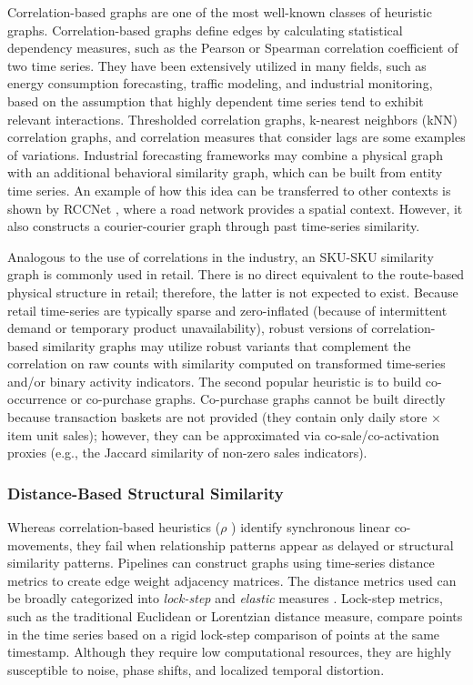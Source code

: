 Correlation-based graphs are one of the most well-known classes of heuristic graphs. Correlation-based graphs define edges by calculating statistical dependency measures, such as the Pearson or Spearman correlation coefficient of two time series. They have been extensively utilized in many fields, such as energy consumption forecasting, traffic modeling, and industrial monitoring, based on the assumption that highly dependent time series tend to exhibit relevant interactions. Thresholded correlation graphs, k-nearest neighbors (kNN) correlation graphs, and correlation measures that consider lags are some examples of variations. Industrial forecasting frameworks may combine a physical graph with an additional behavioral similarity graph, which can be built from entity time series. An example of how this idea can be transferred to other contexts is shown by RCCNet \cite{10.1145/3690649}, where a road network provides a spatial context. However, it also constructs a courier-courier graph through past time-series similarity.

Analogous to the use of correlations in the industry, an SKU-SKU similarity graph is commonly used in retail. There is no direct equivalent to the route-based physical structure in retail; therefore, the latter is not expected to exist. Because retail time-series are typically sparse and zero-inflated (because of intermittent demand or temporary product unavailability), robust versions of correlation-based similarity graphs may utilize robust variants that complement the correlation on raw counts with similarity computed on transformed time-series and/or binary activity indicators.  The second popular heuristic is to build co-occurrence or co-purchase graphs. Co-purchase graphs cannot be built directly because transaction baskets are not provided (they contain only daily store × item unit sales); however, they can be approximated via co-sale/co-activation proxies (e.g., the Jaccard similarity of non-zero sales indicators).

\subsubsection{Distance-Based Structural Similarity}
Whereas correlation-based heuristics ($\rho$ ) identify synchronous linear co-movements, they fail when relationship patterns appear as delayed or structural similarity patterns. Pipelines can construct graphs using time-series distance metrics to create edge weight adjacency matrices. The distance metrics used can be broadly categorized into \emph{ lock-step }and \emph{ elastic } measures \cite{esling2012time}. Lock-step metrics, such as the traditional Euclidean or Lorentzian distance measure, compare points in the time series based on a rigid lock-step comparison of points at the same timestamp. Although they require low computational resources, they are highly susceptible to noise, phase shifts, and localized temporal distortion.

